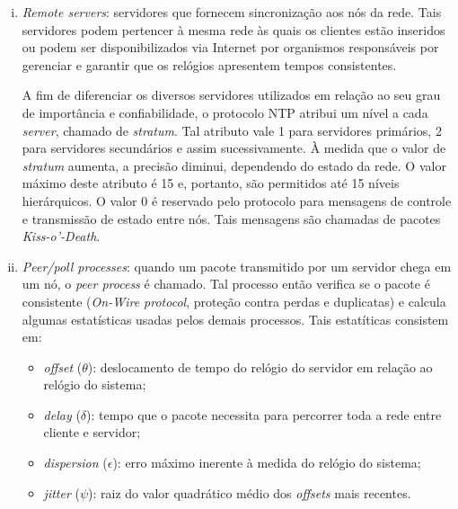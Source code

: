 \begin {enumerate}[i.]
  \item \textit{Remote servers}: servidores que fornecem sincronização aos nós
  da rede. Tais servidores podem pertencer à mesma rede às quais os clientes
  estão inseridos ou podem ser disponibilizados via Internet por organismos
  responsáveis por gerenciar e garantir que os relógios apresentem tempos
  consistentes. 
  
  A fim de diferenciar os diversos servidores utilizados em relação ao seu grau
  de importância e confiabilidade, o protocolo NTP atribui um nível a cada
  \textit{server}, chamado de \textit{stratum}. Tal atributo vale 1 para
  servidores primários, 2 para servidores secundários e assim sucessivamente. À
  medida que o valor de \textit{stratum} aumenta, a precisão diminui,
  dependendo do estado da rede. O valor máximo deste atributo é 15 e, portanto,
  são permitidos até 15 níveis hierárquicos. O valor 0 é reservado pelo
  protocolo para mensagens de controle e transmissão de estado entre nós. Tais
  mensagens são chamadas de pacotes \textit{Kiss-o'-Death}.
  
  
  \item \textit{Peer/poll processes}: quando um pacote transmitido por um
  servidor chega em um nó, o \textit{peer process} é chamado. Tal processo então
  verifica se o pacote é consistente (\textit{On-Wire protocol}, proteção
  contra perdas e duplicatas) e calcula algumas estatísticas usadas pelos demais
  processos. Tais estatíticas consistem em:
  		
  		\begin{itemize}
  		  \renewcommand\labelitemi{--}
  		  \item \textit{offset} (\(\theta\)): deslocamento de tempo do
  		  relógio do servidor em relação ao relógio do sistema;
  		  \item \textit{delay} (\(\delta\)): tempo que o pacote necessita para
  		  percorrer toda a rede entre cliente e servidor;
  		  \item \textit{dispersion} (\( \epsilon \)): erro máximo inerente à medida
  		  do relógio do sistema;
  		  \item \textit {jitter} (\( \psi \)): raiz do valor quadrático médio dos
  		  \textit{offsets} mais recentes.
  		\end{itemize}
  		

\end{enumerate}

